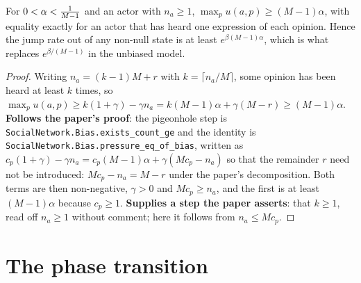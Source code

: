 \begin{remark}
  \label{rem8}
  \leanok
  For $0 < \alpha < \tfrac{1}{M-1}$ and an actor with $n_a \ge 1$,
  $\max_{p} u(a,p) \ge (M-1)\alpha$, with equality exactly for an actor that has
  heard one expression of each opinion.  Hence the jump rate out of any non-null
  state is at least $e^{\beta (M-1)\alpha}$, which is what replaces
  $e^{\beta/(M-1)}$ in the unbiased model.
\end{remark}
\begin{proof}
  \leanok
  Writing $n_a = (k-1)M + r$ with $k = \lceil n_a/M \rceil$, some opinion has
  been heard at least $k$ times, so
  $\max_p u(a,p) \ge k(1+\gamma) - \gamma n_a = k(M-1)\alpha + \gamma(M-r)
   \ge (M-1)\alpha$.  \textbf{Follows the paper's proof}: the pigeonhole step is
  \texttt{SocialNetwork.Bias.exists\_count\_ge} and the identity is
  \texttt{SocialNetwork.Bias.pressure\_eq\_of\_bias}, written as
  $c_p(1+\gamma) - \gamma n_a = c_p (M-1)\alpha + \gamma(M c_p - n_a)$ so that
  the remainder $r$ need not be introduced: $M c_p - n_a = M - r$ under the
  paper's decomposition.  Both terms are then non-negative, $\gamma > 0$ and
  $M c_p \ge n_a$, and the first is at least $(M-1)\alpha$ because $c_p \ge 1$.
  \textbf{Supplies a step the paper asserts}: that $k \ge 1$, read off $n_a \ge 1$
  without comment; here it follows from $n_a \le M c_p$.
\end{proof}

\section{The phase transition}

